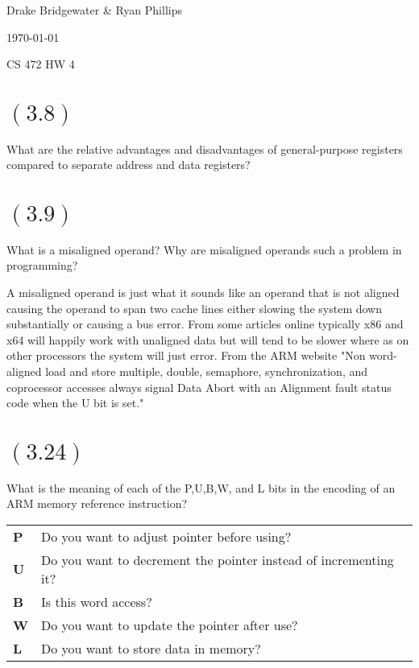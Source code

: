 \documentclass[letterpaper,12pt,titlepage]{article}
\def\name{Drake Bridgewater \& Ryan Phillips}
\begin{document}
\hfill \name

\hfill \today

\hfill CS 472 HW 4

\section*{$(3.8)$} What are the relative advantages and disadvantages of general-purpose registers compared to separate address and data registers?

\begin{mdframed}[style=MyFrame]
\end{mdframed}

\section*{$(3.9)$} What is a misaligned operand? Why are misaligned operands such a problem in programming?

\begin{mdframed}[style=MyFrame]
A misaligned operand is just what it sounds like an operand that is not aligned causing the operand to span two cache lines either slowing the system down substantially or causing a bus error. From some articles online typically x86 and x64 will happily work with unaligned data but will tend to be slower where as on other processors the system will just error. From the ARM website "Non word-aligned load and store multiple, double, semaphore, synchronization, and coprocessor accesses always signal Data Abort with an Alignment fault status code when the U bit is set." \cite{ARM}
\end{mdframed}

\section*{$(3.24)$} What is the meaning of each of the P,U,B,W, and L bits in the encoding of an ARM memory reference instruction?
\begin{mdframed}[style=MyFrame]
\begin{tabular}{l l}
\textbf{P} & Do you want to adjust pointer before using?\\
\textbf{U} & Do you want to decrement the pointer instead of incrementing it?\\
\textbf{B} & Is this word access?\\
\textbf{W} & Do you want to update the pointer after use?\\
\textbf{L} & Do you want to store data in memory?
\end{tabular}
\end{mdframed}
\end{document}
